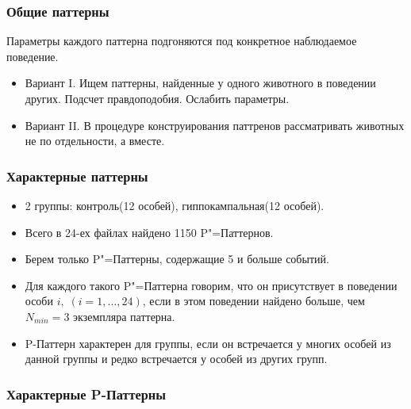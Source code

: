 \documentclass[smaller]{beamer}
\begin{document}
\begin{frame}
  \frametitle{Общие паттерны}
  Параметры каждого паттерна подгоняются под конкретное наблюдаемое поведение. 
  \begin{itemize}
  \item Вариант I. Ищем паттерны, найденные у одного животного в поведении других. Подсчет правдоподобия. Ослабить параметры.
  \item Вариант II. В процедуре конструирования паттренов рассматривать животных не по отдельности, а вместе. 
  \end{itemize}
\end{frame}

\begin{frame}
  \frametitle{Характерные паттерны}
   \begin{itemize}
  \item 2 группы: контроль(12 особей), гиппокампальная(12 особей).
  \item Всего в 24-ех файлах найдено 1150 P"=Паттернов. 
  \item Берем только P"=Паттерны, содержащие 5 и больше событий.
  \item Для каждого такого P"=Паттерна говорим, что он присутствует в 
       поведении особи $i,\;(i=1,\dots, 24)$, если в этом поведении найдено больше, чем $N_{min}=3$ экземпляра паттерна. 
  \item P-Паттерн характерен для группы, если он встречается у многих особей из данной группы и редко встречается 
у особей из других групп.
  
   \end{itemize}
\end{frame}

\begin{frame}
  \frametitle{Характерные P-Паттерны}
\begin{figure}[h]
\noindent{}

\end{figure}
\end{frame}
\end{document}
